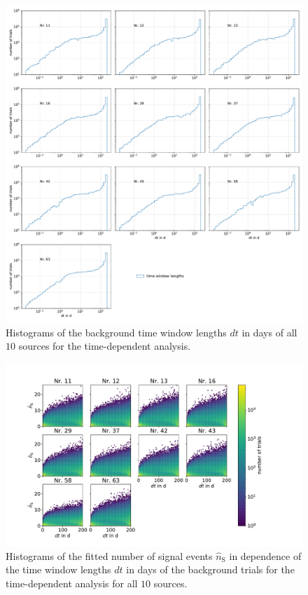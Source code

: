\begin{figure}
    \centering
    \includegraphics[width=\linewidth]{Plots/05_csky/9_years_gfu_gold_time_dep_bg_dt.pdf}
    \caption{Histograms of the background time window lengths $dt$ in days of all $\num{10}$ sources for the time-dependent analysis.}
    \label{fig:bg_trials_time_dep_time_windows}
\end{figure}

\begin{figure}
    \centering
    \includegraphics[width=16cm]{Plots/05_csky/time_window_ns_bg_time_dep.pdf}
    \caption{Histograms of the fitted number of signal events $\hat{n}_\text{S}$ in dependence of the time window lengths $dt$ in days of the background trials for the time-dependent analysis for all $\num{10}$ sources.}
    \label{fig:bg_trials_time_dep_time_windows_ns}
\end{figure}

